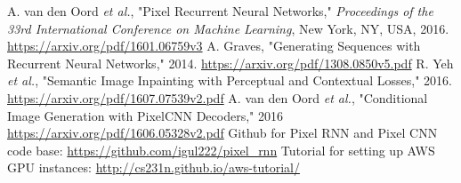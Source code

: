 \documentclass[10pt,twocolumn,letterpaper]{article}
\begin{document}
\begin{thebibliography}{1}
 A. van den Oord \textit{et al.}, "Pixel Recurrent Neural Networks," \textit{Proceedings of the 33rd International Conference on Machine Learning}, New York, NY, USA, 2016. \url{https://arxiv.org/pdf/1601.06759v3}
 A. Graves, "Generating Sequences with Recurrent Neural Networks," 2014. \url{https://arxiv.org/pdf/1308.0850v5.pdf}
 R. Yeh \textit{et al.}, "Semantic Image Inpainting with Perceptual and Contextual Losses," 2016. \url{https://arxiv.org/pdf/1607.07539v2.pdf}
 A. van den Oord \textit{et al.}, "Conditional Image Generation with PixelCNN Decoders," 2016 \url{https://arxiv.org/pdf/1606.05328v2.pdf}
 Github for Pixel RNN and Pixel CNN code base: \url{https://github.com/igul222/pixel_rnn}
 Tutorial for setting up AWS GPU instances: \url{http://cs231n.github.io/aws-tutorial/}
\end{thebibliography}
\end{document}
